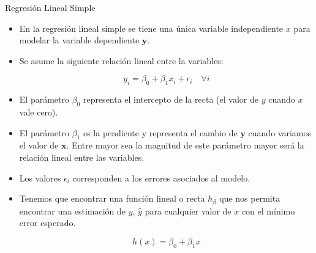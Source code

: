 \documentclass[handout]{beamer}
\begin{document}
\begin{frame}{Regresión Lineal Simple}
\scriptsize{
\begin{itemize}
 \item En la regresión lineal simple se tiene una única variable independiente $x$ para modelar la variable dependiente $\mathbf{y}$.

 \item Se asume la siguiente relación lineal entre la variables:

\begin{displaymath}
 y_i=\beta_{0}+\beta_{1}x_i +\epsilon_i \quad \forall i
\end{displaymath}

\item El parámetro $\beta_{0}$ representa el intercepto de la recta (el valor de $y$ cuando $x$ vale cero). 

\item El parámetro $\beta_{1}$ es la pendiente y representa el cambio de $\mathbf{y}$ cuando variamos el valor de $\mathbf{x}$. Entre mayor sea la magnitud de este parámetro mayor será la relación lineal entre las variables.

\item Los valores $\epsilon_{i}$ corresponden a los errores asociados al modelo.

\item Tenemos que encontrar una función lineal o recta $h_\beta$ que nos permita encontrar una estimación de $y$, $\hat{y}$ para cualquier valor de $x$ con el mínimo error esperado.

\begin{displaymath}
h(x)=\beta_{0}+\beta_{1}x 
\end{displaymath}


\end{itemize}


} 
 
\end{frame}
\end{document}
